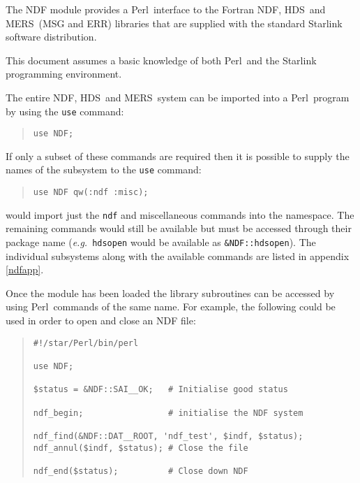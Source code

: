 \documentclass[twoside,11pt]{article}
\newenvironment{myquote}{\begin{quote}\begin{small}}{\end{small}\end{quote}}
\newcommand{\ndf}{\xref{NDF}{sun33}{}}
\newcommand{\perl}{\xref{\textsf{Perl}}{sun193}{}}
\newcommand{\hds}{\xref{HDS}{sun92}{}}
\newcommand{\mers}{\xref{MERS}{sun104}{}}
\newcommand{\xref}[3]{#1}
\renewcommand{\_}{\texttt{\symbol{95}}}
\begin{document}
The NDF module provides a \perl\ interface to the Fortran \ndf, \hds\ and
\mers\ (MSG and ERR) libraries that are supplied with the standard Starlink
software distribution.

This document assumes a basic knowledge of both \perl\ and the Starlink
programming environment.

The entire \ndf, \hds\ and \mers\ system can be imported into a \perl\ program
by using the \texttt{use} command:

\begin{myquote}
\begin{verbatim}
use NDF;
\end{verbatim}
\end{myquote}

If only a subset of these commands are required then it is possible to supply
the names of the subsystem to the \texttt{use} command:

\begin{myquote}
\begin{verbatim}
use NDF qw(:ndf :misc);
\end{verbatim}
\end{myquote}

would import just the \texttt{ndf\_} and miscellaneous commands into
the namespace. The remaining commands would still be available but must
be accessed through their package name (\emph{e.g.}\ \texttt{hds\_open}
would be available as \texttt{\&NDF::hds\_open}). The individual
subsystems along with the available commands are listed in appendix
\ref{ndfapp}.

Once the module has been loaded the library subroutines can be accessed
by using \perl\ commands of the same name. For example, the following
could be used in order to open and close an NDF file:

\begin{myquote}
\begin{verbatim}
#!/star/Perl/bin/perl

use NDF;

$status = &NDF::SAI__OK;   # Initialise good status

ndf_begin;                 # initialise the NDF system

ndf_find(&NDF::DAT__ROOT, 'ndf_test', $indf, $status);
ndf_annul($indf, $status); # Close the file

ndf_end($status);          # Close down NDF
\end{verbatim}
\end{myquote}
\end{document}
